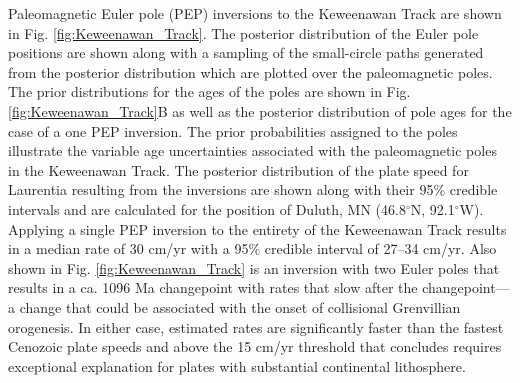 \documentclass[11pt,letterpaper]{article}
\begin{document}
Paleomagnetic Euler pole (PEP) inversions to the Keweenawan Track are shown in Fig. \ref{fig:Keweenawan_Track}. The posterior distribution of the Euler pole positions are shown along with a sampling of the small-circle paths generated from the posterior distribution which are plotted over the paleomagnetic poles. The prior distributions for the ages of the poles are shown in Fig. \ref{fig:Keweenawan_Track}B as well as the posterior distribution of pole ages for the case of a one PEP inversion. The prior probabilities assigned to the poles illustrate the variable age uncertainties associated with the paleomagnetic poles in the Keweenawan Track. The posterior distribution of the plate speed for Laurentia resulting from the inversions are shown along with their 95$\%$ credible intervals and are calculated for the position of Duluth, MN (46.8$^\circ$N, 92.1$^\circ$W). Applying a single PEP inversion to the entirety of the Keweenawan Track results in a median rate of 30 cm/yr with a 95$\%$ credible interval of 27–34 cm/yr. Also shown in Fig. \ref{fig:Keweenawan_Track} is an inversion with two Euler poles that results in a ca. 1096 Ma changepoint with rates that slow after the changepoint---a change that could be associated with the onset of collisional Grenvillian orogenesis. In either case, estimated rates are significantly faster than the fastest Cenozoic plate speeds and above the 15 cm/yr threshold that \cite{Zahirovic2015a} concludes requires exceptional explanation for plates with substantial continental lithosphere.
\end{document}
